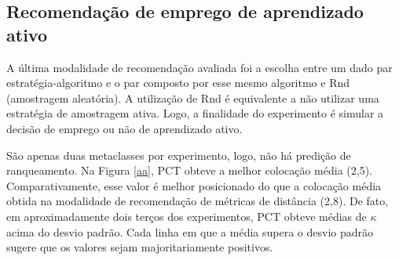 \subsection{Recomendação de emprego de aprendizado ativo}\label{reccon}

A última modalidade de recomendação avaliada foi a escolha entre um dado par estratégia-algoritmo e o par composto por esse mesmo algoritmo e Rnd (amostragem aleatória).
A utilização de Rnd é equivalente a não utilizar uma estratégia de amostragem ativa.
Logo, a finalidade do experimento é simular a decisão de emprego ou não de aprendizado ativo.

São apenas duas metaclasses por experimento, logo, não há predição de ranqueamento.
Na Figura \ref{aa}, PCT obteve a melhor colocação média (2,5).
Comparativamente, esse valor é melhor posicionado do que a colocação média obtida na modalidade de recomendação de métricas de distância (2,8).
De fato, em aproximadamente dois terços dos experimentos, PCT obteve médias de $\kappa$ acima do desvio padrão.
Cada linha em que a média supera o desvio padrão sugere que os valores sejam majoritariamente positivos.
